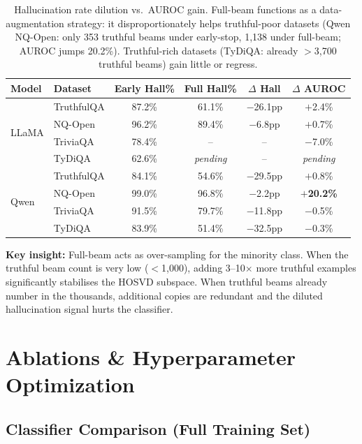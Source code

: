 \documentclass[11pt,a4paper]{article}
\begin{document}
\begin{table}[h]
\centering
\small
\begin{tabular}{llcccc}
\toprule
\textbf{Model} & \textbf{Dataset} & \textbf{Early Hall\%} & \textbf{Full Hall\%} & \textbf{$\Delta$ Hall} & \textbf{$\Delta$ AUROC} \\
\midrule
\multirow{4}{*}{LLaMA} & TruthfulQA & 87.2\% & 61.1\% & $-$26.1pp & \textcolor{upgreen}{$+$2.4\%} \\
  & NQ-Open  & 96.2\% & 89.4\% & $-$6.8pp & \textcolor{upgreen}{$+$0.7\%} \\
  & TriviaQA & 78.4\% & -- & -- & \textcolor{downred}{$-$7.0\%} \\
  & TyDiQA   & 62.6\% & \textit{pending} & -- & \textit{pending} \\
\midrule
\multirow{4}{*}{Qwen} & TruthfulQA & 84.1\% & 54.6\% & $-$29.5pp & \textcolor{upgreen}{$+$0.8\%} \\
  & NQ-Open  & 99.0\% & 96.8\% & $-$2.2pp & \textcolor{upgreen}{$+$\textbf{20.2\%}} \\
  & TriviaQA & 91.5\% & 79.7\% & $-$11.8pp & \textcolor{downred}{$-$0.5\%} \\
  & TyDiQA   & 83.9\% & 51.4\% & $-$32.5pp & \textcolor{downred}{$-$0.3\%} \\
\bottomrule
\end{tabular}
\caption{Hallucination rate dilution vs.\ AUROC gain.  Full-beam functions as
         a data-augmentation strategy: it disproportionately helps truthful-poor
         datasets (Qwen NQ-Open: only 353 truthful beams under early-stop, 1,138
         under full-beam; AUROC jumps 20.2\%).  Truthful-rich datasets
         (TyDiQA: already $>$3,700 truthful beams) gain little or regress.}
\end{table}

\noindent
\textbf{Key insight:} Full-beam acts as over-sampling for the minority class.
When the truthful beam count is very low ($<$1,000), adding 3--10$\times$ more
truthful examples significantly stabilises the HOSVD subspace.  When truthful
beams already number in the thousands, additional copies are redundant and the
diluted hallucination signal hurts the classifier.

\section{Ablations \& Hyperparameter Optimization}

\subsection{Classifier Comparison (Full Training Set)}
\end{document}
